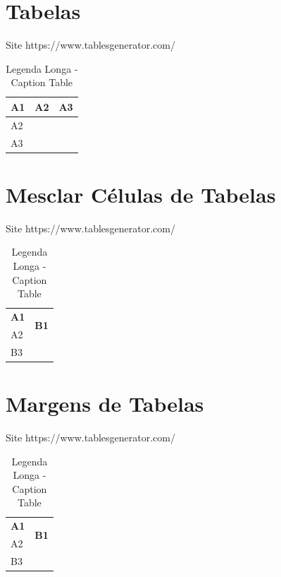 \documentclass[12pt]{article}
\begin{document}
\newpage
\section{Tabelas}

Site https://www.tablesgenerator.com/

\begin{table}[H]
	\centering
	\caption[legenda curta]{Legenda Longa - Caption Table}
	\label{tab:Label Table}
	\begin{tabular}{|l|l|l|}
		\hline
		\textbf{A1} & \textbf{A2} & \textbf{A3} \\ \hline
		A2          &             &             \\ \hline
		A3          &             &             \\ \hline
	\end{tabular}
\end{table}

\newpage
\section{Mesclar Células de Tabelas}

Site https://www.tablesgenerator.com/

\renewcommand{\arraystretch}{1.5}
\begin{table}[H]
	\centering
	\caption[legenda curta]{Legenda Longa - Caption Table}
	\label{tab:Label Table}
	\begin{tabular}{|l|l|l|}
		\hline
		\textbf{A1} & \multicolumn{2}{l|}{\multirow{2}{*}{\textbf{B1}}}\\ \cline{1-1}
		A2          &  \multicolumn{2}{l|}{}          \\ \hline
		B3          &             &                   \\ \hline
	\end{tabular}
\end{table}



\newpage
\section{Margens de Tabelas}

Site https://www.tablesgenerator.com/

\renewcommand{\arraystretch}{1.5}
\begin{table}[H]
	\centering
	\caption[legenda curta]{Legenda Longa - Caption Table}
	\label{tab:Label Table}
	\begin{tabularx}{0.5\textwidth}{|X|X|X|}
		\hline
		\centering\textbf{A1} & \multicolumn{2}{c|}{\multirow{2}{*}{\textbf{B1}}}\\ \cline{1-1}
		A2          &  \multicolumn{2}{l|}{}          \\ \hline
		B3          &             &                   \\ \hline
	\end{tabularx}
\end{table}
\end{document}
